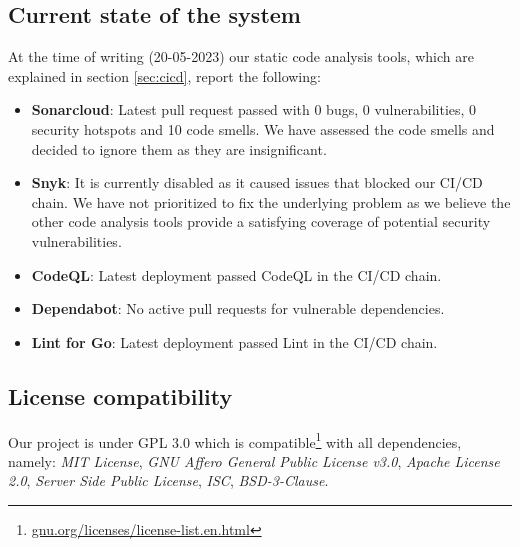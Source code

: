 \subsection{Current state of the system}
At the time of writing (20-05-2023) our static code analysis tools, which are explained in section \ref{sec:cicd}, report the following:
\begin{itemize}
    \item \textbf{Sonarcloud}: Latest pull request passed with 0 bugs, 0 vulnerabilities, 0 security hotspots and 10 code smells. We have assessed the code smells and decided to ignore them as they are insignificant.
    \item \textbf{Snyk}: It is currently disabled as it caused issues that blocked our CI/CD chain. We have not prioritized to fix the underlying problem as we believe the other code analysis tools provide a satisfying coverage of potential security vulnerabilities.
    \item \textbf{CodeQL}: Latest deployment passed CodeQL in the CI/CD chain.
    \item \textbf{Dependabot}: No active pull requests for vulnerable dependencies.
    \item \textbf{Lint for Go}: Latest deployment passed Lint in the CI/CD chain.
\end{itemize}

\subsection{License compatibility}
Our project is under GPL 3.0 which is compatible\footnote{\href{https://www.gnu.org/licenses/license-list.en.html}{gnu.org/licenses/license-list.en.html}} with all dependencies, namely: \textit{MIT License}, \textit{GNU Affero General Public License v3.0}, \textit{Apache License 2.0}, \textit{Server Side Public License}, \textit{ISC}, \textit{BSD-3-Clause}. 


